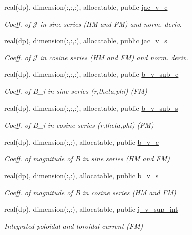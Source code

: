 \begin{DoxyCompactItemize}
real(dp), dimension(\+:,\+:,\+:), allocatable, public \hyperlink{namespacevmec__vars_a1cc9293ec589081fb212b88f4e5592f0}{jac\+\_\+v\+\_\+c}
\begin{DoxyCompactList}\small\item\em Coeff. of $\mathcal{J}$ in sine series (HM and FM) and norm. deriv. \end{DoxyCompactList}\item 
real(dp), dimension(\+:,\+:,\+:), allocatable, public \hyperlink{namespacevmec__vars_a82168b3717cf13d2d8a50f5cfc19fded}{jac\+\_\+v\+\_\+s}
\begin{DoxyCompactList}\small\item\em Coeff. of $\mathcal{J}$ in cosine series (HM and FM) and norm. deriv. \end{DoxyCompactList}\item 
real(dp), dimension(\+:,\+:,\+:), allocatable, public \hyperlink{namespacevmec__vars_a2e07a2b5bd2384e16e8af8ca4f5b50d6}{b\+\_\+v\+\_\+sub\+\_\+c}
\begin{DoxyCompactList}\small\item\em Coeff. of B\+\_\+i in sine series (r,theta,phi) (FM) \end{DoxyCompactList}\item 
real(dp), dimension(\+:,\+:,\+:), allocatable, public \hyperlink{namespacevmec__vars_aac5e249f0f14cf1e542f881d1777b730}{b\+\_\+v\+\_\+sub\+\_\+s}
\begin{DoxyCompactList}\small\item\em Coeff. of B\+\_\+i in cosine series (r,theta,phi) (FM) \end{DoxyCompactList}\item 
real(dp), dimension(\+:,\+:), allocatable, public \hyperlink{namespacevmec__vars_ad6833cc726863147b8fed188d3a28f5d}{b\+\_\+v\+\_\+c}
\begin{DoxyCompactList}\small\item\em Coeff. of magnitude of B in sine series (HM and FM) \end{DoxyCompactList}\item 
real(dp), dimension(\+:,\+:), allocatable, public \hyperlink{namespacevmec__vars_ab2aa43fe35401e8f2b7ffb2facad7109}{b\+\_\+v\+\_\+s}
\begin{DoxyCompactList}\small\item\em Coeff. of magnitude of B in cosine series (HM and FM) \end{DoxyCompactList}\item 
real(dp), dimension(\+:,\+:), allocatable, public \hyperlink{namespacevmec__vars_aa822a336e5823876fea884b07857389c}{j\+\_\+v\+\_\+sup\+\_\+int}
\begin{DoxyCompactList}\small\item\em Integrated poloidal and toroidal current (FM) \end{DoxyCompactList}\end{DoxyCompactItemize}


